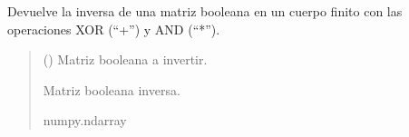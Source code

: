 \documentclass[letterpaper,10pt,english]{sphinxmanual}
\begin{document}
\begin{fulllineitems}
\label{\detokenize{myutils:myutils.bool.invert_matrix_gf2}}
\pysigstartsignatures
{}
\pysigstopsignatures
\sphinxAtStartPar
Devuelve la inversa de una matriz booleana en un cuerpo finito con las operaciones XOR (“+”) y AND (“*”).
\begin{quote}\begin{description}
\sphinxAtStartPar
{} () \textendash{} Matriz booleana a invertir.

\sphinxAtStartPar
Matriz booleana inversa.

\sphinxAtStartPar
numpy.ndarray

\end{description}\end{quote}

\end{fulllineitems}

\end{document}

